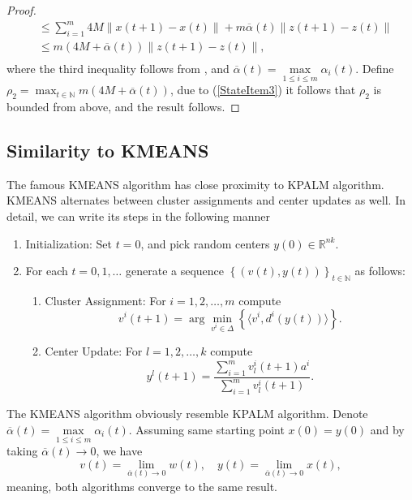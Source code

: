 \documentclass[11pt]{article}
\numberwithin{equation}{section}
\begin{document}
\begin{proof}
\begin{equation*}
\begin{aligned}
	& \leq \sum\limits_{i=1}^{m} 4M \| x(t+1) - x(t) \| + m \overline{\alpha}(t) \|z(t+1) - z(t)\| \\
	& \leq m \left( 4M + \overline{\alpha}(t) \right) \|z(t+1) - z(t)\| , \\
\end{aligned}
\end{equation*}
where the third inequality follows from , and $\overline{\alpha}(t) = \max\limits_{1 \leq i \leq m} \alpha_i(t)$. Define \\$\rho_2 = \max_{t\in \mathbb{N}} m \left( 4M + \overline{\alpha}(t) \right)$, due to (\ref{StateItem3}) it follows that $\rho_2$ is bounded from above, and the result follows.
\end{proof}


\subsection{Similarity to KMEANS}
The famous KMEANS algorithm has close proximity to KPALM algorithm. KMEANS alternates between cluster assignments and center updates as well. In detail, we can write its steps in the following manner

\begin{enumerate}[(1)]
	\item Initialization: Set $t=0$, and pick random centers $y(0) \in \mathbb{R}^{nk}$.

	\item For each $t=0,1, \ldots$ generate a sequence $\left\lbrace(v(t),y(t))\right\rbrace_{t \in \mathbb{N}}$ as follows:
	\begin{enumerate}[(2.1)]
		\item Cluster Assignment: For $i=1, 2, \ldots ,m$ compute
		\begin{equation}
			v^i(t+1) = \arg\min\limits_{v^i \in \Delta} \left\lbrace \langle v^i , d^i(y(t)) \rangle\right\rbrace . \label{StateEq12}
		\end{equation}
		
		\item Center Update: For $l=1, 2, \ldots ,k$ compute
		\begin{equation}
			y^l(t+1) = \frac{\sum_{i=1}^{m} v^i_l(t+1) a^i}{\sum_{i=1}^{m} v^i_l(t+1)} . \label{StateEq13}
		\end{equation}
	\end{enumerate}
\end{enumerate}
The KMEANS algorithm obviously resemble KPALM algorithm. Denote $\overline{\alpha}(t) = \max\limits_{1 \leq i \leq m} \alpha_i(t)$. Assuming same starting point $x(0) = y(0)$ and by taking $\overline{\alpha}(t) \to 0$, we have
\begin{equation*}
	v(t) = \lim_{\overline{\alpha}(t) \to 0} w(t), \quad
	y(t) = \lim_{\overline{\alpha}(t) \to 0} x(t),
\end{equation*}
meaning, both algorithms converge to the same result.
\end{document}
